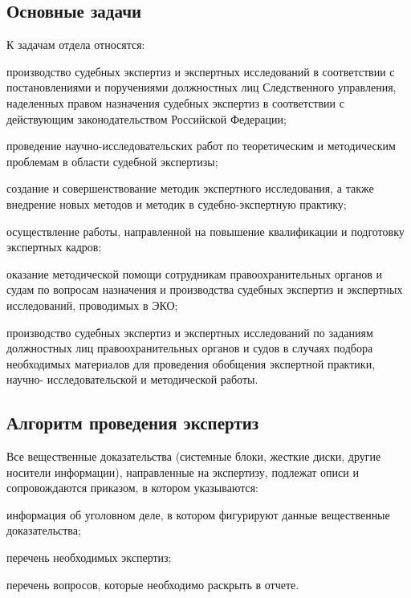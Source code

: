 \subsection{Основные задачи}
К задачам отдела относятся:
\begin{itemize*}
	\item производство судебных экспертиз и экспертных исследований в соответствии с постановлениями и поручениями должностных лиц Следственного управления, наделенных правом назначения судебных экспертиз в соответствии с действующим законодательством Российской Федерации;
	\item проведение научно-исследовательских работ по теоретическим и методическим проблемам в области судебной экспертизы;
	\item создание и совершенствование методик экспертного исследования, а также внедрение новых методов и методик в судебно-экспертную практику;
	\item осуществление работы, направленной на повышение квалификации и подготовку экспертных кадров;
	\item оказание методической помощи сотрудникам правоохранительных органов и судам по вопросам назначения и производства судебных экспертиз и экспертных исследований, проводимых в ЭКО;
	\item производство судебных экспертиз и экспертных исследований по заданиям должностных лиц правоохранительных органов и судов в случаях подбора необходимых материалов для проведения обобщения экспертной практики, научно- исследовательской и методической работы.
\end{itemize*}

\subsection{Алгоритм проведения экспертиз}

Все вещественные доказательства (системные блоки, жесткие диски, другие носители информации), направленные на экспертизу, подлежат описи и сопровождаются приказом, в котором указываются:

\begin{itemize*}
	\item информация об уголовном деле, в котором фигурируют данные вещественные доказательства;
	\item перечень необходимых экспертиз;
	\item перечень вопросов, которые необходимо раскрыть в отчете.
\end{itemize*}

